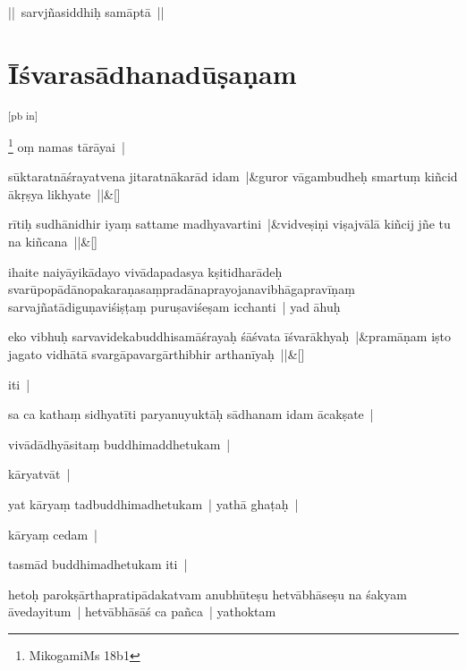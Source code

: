 \documentclass[article,a4paper]{memoir}
\begin{document}
	

	  \pstart || sarvjñasiddhiḥ samā\-ptā\- || 
	\pend
      \label{īśvarasādhanadūṣaṇam}
	  
	
\section[{Īśvarasā\-dhanadū\-ṣaṇam}]{Īśvarasā\-dhanadū\-ṣaṇam}\label{īśvarasādhanadūṣaṇam}\leavevmode\textsuperscript{\rmlatinfont\tiny [pb in]}\label{RNAms_18b}

	  \pstart \footnote{Mikogami\textunderscore Ms 18b1} \label{thakur75-32.4} oṃ namas tā\-rā\-yai |
	\pend
      
	    
	    \stanza[\smallbreak]
sū\-ktaratnā\-śrayatvena jitaratnā\-karā\-d idam |&guror vā\-gambudheḥ smartuṃ kiñcid ā\-kṛṣya likhyate ||\&[\smallbreak]


	
	    
	    \stanza[\smallbreak]
rī\-tiḥ sudhā\-nidhir iyaṃ sattame madhyavartini |&vidveṣiṇi viṣajvā\-lā\- kiñcij jñe tu na kiñcana ||\&[\smallbreak]


	

	  \pstart ihaite naiyā\-yikā\-dayo vivā\-dapadasya kṣitidharā\-deḥ svarū\-popā\-dā\-nopakaraṇasaṃpradā\-naprayojanavibhā\-gapravī\-ṇaṃ sarvajñatā\-diguṇaviśiṣṭaṃ puruṣaviśeṣam icchanti | yad ā\-huḥ
	\pend
      
	    
	    \stanza[\smallbreak]
eko vibhuḥ sarvavidekabuddhisamā\-śrayaḥ śā\-śvata ī\-śvarā\-khyaḥ |&pramā\-ṇam iṣto jagato vidhā\-tā\- svargā\-pavargā\-rthibhir arthanī\-yaḥ ||\&[\smallbreak]


	

	  \pstart iti |
	\pend
      

	  \pstart sa ca kathaṃ sidhyatī\-ti paryanuyuktā\-ḥ sā\-dhanam idam ā\-cakṣate |
	\pend
      

	  \pstart vivā\-dā\-dhyā\-sitaṃ buddhimaddhetukam |
	\pend
      

	  \pstart kā\-ryatvā\-t |
	\pend
      

	  \pstart yat kā\-ryaṃ tadbuddhimadhetukam | yathā\- ghaṭaḥ |
	\pend
      

	  \pstart kā\-ryaṃ cedam |
	\pend
      

	  \pstart tasmā\-d buddhimadhetukam iti |
	\pend
      

	  \pstart hetoḥ parokṣā\-rthapratipā\-dakatvam anubhū\-teṣu hetvā\-bhā\-seṣu na śakyam ā\-vedayitum | hetvā\-bhā\-sā\-ś ca pañca | yathoktam
	\pend
      
\end{document}
